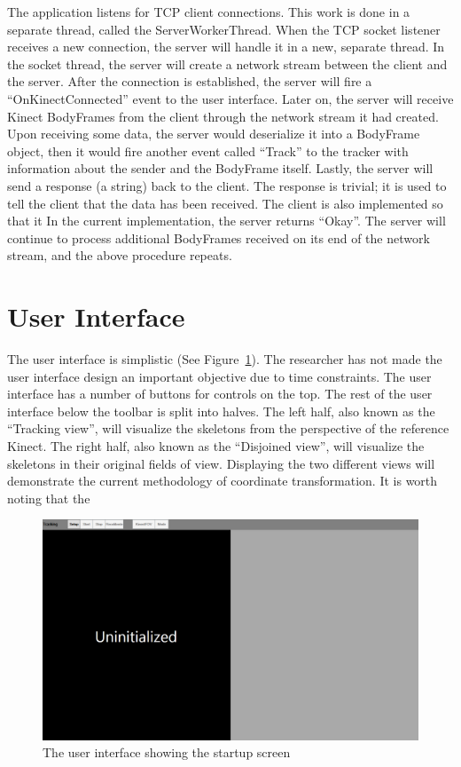 The application listens for TCP client connections. This work is done in a separate thread, called the ServerWorkerThread. When the TCP socket listener receives a new connection, the server will handle it in a new, separate thread. In the socket thread, the server will create a network stream between the client and the server. After the connection is established, the server will fire a ``OnKinectConnected'' event to the user interface. Later on, the server will receive Kinect BodyFrames from the client through the network stream it had created. Upon receiving some data, the server would deserialize it into a BodyFrame object, then it would fire another event called ``Track'' to the tracker with information about the sender and the BodyFrame itself. Lastly, the server will send a response (a string) back to the client. The response is trivial; it is used to tell the client that the data has been received. The client is also implemented so that it In the current implementation, the server returns ``Okay''. The server will continue to process additional BodyFrames received on its end of the network stream, and the above procedure repeats.

\section{User Interface}
\label{sec:implementation_ui}

The user interface is simplistic (See Figure~\ref{fig:ui}). The researcher has not made the user interface design an important objective due to time constraints. The user interface has a number of buttons for controls on the top. The rest of the user interface below the toolbar is split into halves. The left half, also known as the ``Tracking view'', will visualize the skeletons from the perspective of the reference Kinect. The right half, also known as the ``Disjoined view'', will visualize the skeletons in their original fields of view. Displaying the two different views will demonstrate the current methodology of coordinate transformation. It is worth noting that the 

\begin{figure}[!h]
  \centering

  \includegraphics[width=0.8\linewidth]{figs/ui}
  
  \caption{The user interface showing the startup screen}
  
  \label{fig:ui}
\end{figure}

